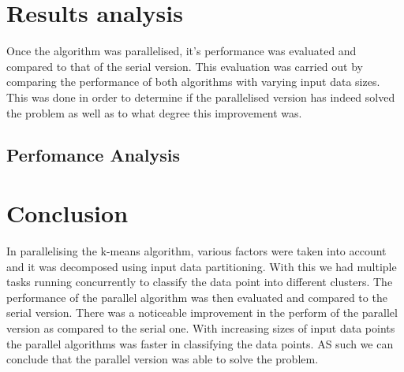\documentclass[12pt]{article}
\begin{document}
  	\section{Results analysis}
    	\begin{flushleft}
			Once the algorithm was parallelised, it’s performance was evaluated and compared to that of the serial version. This evaluation was carried out by comparing the performance of both algorithms with varying input data sizes. This was done in order to determine if the parallelised version has indeed solved the problem as well as to what degree this improvement was.
    	\end{flushleft}
    	
    	\subsection{Perfomance Analysis}
    		\begin{flushleft}
    			
    		\end{flushleft}
    	
	\section{Conclusion}
    	\begin{flushleft}
			In parallelising the k-means algorithm, various factors were taken into account and it was decomposed using input data partitioning. With this we had multiple tasks running concurrently to classify the data point into different clusters. The performance of the parallel algorithm was then evaluated and compared to the serial version. There was a noticeable improvement in the perform of the parallel version as compared to the serial one. With increasing sizes of input data points the parallel algorithms was faster in classifying the data points. AS such we can conclude that the parallel version was able to solve the problem.
    	\end{flushleft}
\end{document}
